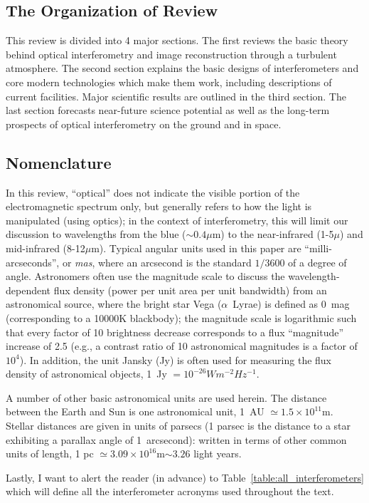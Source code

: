 \documentclass[12pt]{iopart}
\begin{document}
\subsection{The Organization of Review}
This review is divided into 4 major sections. The first reviews the
basic theory behind optical interferometry and image reconstruction
through a turbulent atmosphere.  The second section explains the basic
designs of interferometers and core modern technologies which make
them work, including descriptions of current facilities.  Major
scientific results are outlined in the third section.  The last
section forecasts near-future science potential as well as the
long-term prospects of optical interferometry on the ground and in
space.

\subsection{Nomenclature}
In this review, ``optical'' does not indicate the visible portion of
the electromagnetic spectrum only, but generally refers to how the
light is manipulated (using optics); in the context of interferometry,
this will limit our discussion to wavelengths from the blue
($\sim0.4\mu$m) to the near-infrared (1-5$\mu$) and mid-infrared
(8-12$\mu$m).  Typical angular units used in this paper are
``milli-arcseconds'', or {\em mas}, where an arcsecond is the standard
$1/3600$ of a degree of angle.  Astronomers often use the magnitude
scale to discuss the wavelength-dependent flux density (power per unit
area per unit bandwidth) from an astronomical source, where the bright
star Vega ($\alpha$~Lyrae) is defined as 0~mag (corresponding to a
10000K blackbody); the magnitude scale is logarithmic such that every
factor of 10 brightness decrease corresponds to a flux ``magnitude''
increase of 2.5 (e.g., a contrast ratio of 10 astronomical magnitudes
is a factor of $10^4$).  In addition, the unit Jansky (Jy) is often
used for measuring the flux density of astronomical objects, 1~Jy
$=10^{-26} W m^{-2} Hz^{-1}$.

A number of other basic astronomical units are used herein.  The
distance between the Earth and Sun is one astronomical unit, 1~AU
$\simeq 1.5 \times 10^{11}$m.  Stellar distances are given in units of
parsecs (1 parsec is the distance to a star exhibiting a parallax
angle of 1~arcsecond): written in terms of other common units of
length, 1 pc $\simeq 3.09\times 10^{16}$m$\sim 3.26$ light years.

Lastly, I want to alert the reader (in advance) 
to Table~\ref{table:all_interferometers}
which will define all the interferometer acronyms used throughout the text.
\end{document}
